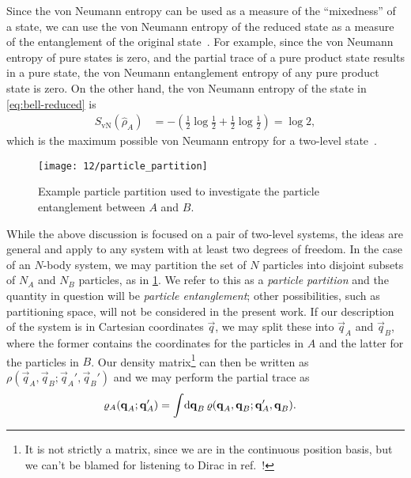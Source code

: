 Since the von Neumann entropy can be used as a measure of the ``mixedness'' of a state, we can use the von Neumann entropy of the reduced state as a measure of the entanglement of the original state~\cite{schumacher1995quantum,vedral1997quantifying}.
For example, since the von Neumann entropy of pure states is zero, and the partial trace of a pure product state results in a pure state, the von Neumann entanglement entropy of any pure product state is zero.
On the other hand, the von Neumann entropy of the state in \cref{eq:bell-reduced} is
\begin{align}
	S_\mathrm{vN}(\hat{\rho}_A)
	&= -\left( \frac{1}{2} \log{\frac{1}{2}} + \frac{1}{2} \log{\frac{1}{2}} \right)
	= \log{2},
\end{align}
which is the maximum possible von Neumann entropy for a two-level state~\cite[255]{wilde2013quantum}.

\begin{figure}
	\centering
	\texttt{[image: 12/particle\_partition]}
	\caption[
		Example particle partition
	]{
		Example particle partition used to investigate the particle entanglement between $A$ and $B$.
	}
	\label{fig:particle-partition}
\end{figure}

While the above discussion is focused on a pair of two-level systems, the ideas are general and apply to any system with at least two degrees of freedom.
In the case of an $N$-body system, we may partition the set of $N$ particles into disjoint subsets of $N_A$ and $N_B$ particles, as in \cref{fig:particle-partition}.
We refer to this as a \emph{particle partition} and the quantity in question will be \emph{particle entanglement}; other possibilities, such as partitioning space, will not be considered in the present work.
If our description of the system is in Cartesian coordinates $\vec{q}$, we may split these into $\vec{q}_A$ and $\vec{q}_B$, where the former contains the coordinates for the particles in $A$ and the latter for the particles in $B$.
Our density matrix\footnote{
	It is not strictly a matrix, since we are in the continuous position basis, but we can't be blamed for listening to Dirac in ref.~\cite[69-70]{dirac1981principles}!
} can then be written as $\rho(\vec{q}_A, \vec{q}_B ; \vec{q}_A', \vec{q}_B')$ and we may perform the partial trace as
\begin{align}
	\rho_A(\vec{q}_A ; \vec{q}_A')
	&= \int\! \dif \vec{q}_B \, \rho(\vec{q}_A, \vec{q}_B ; \vec{q}_A', \vec{q}_B).
\end{align}


